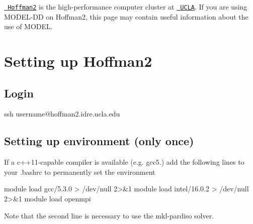 \href{https://idre.ucla.edu/hoffman2}{\texttt{ Hoffman2}} is the high-\/performance computer cluster at \href{http://www.ucla.edu}{\texttt{ U\+C\+LA}}. If you are using M\+O\+D\+E\+L-\/\+DD on Hoffman2, this page may contain useful information about the use of M\+O\+D\+EL.

\subparagraph*{}\hypertarget{hoffman2_hoffman2_setup}{}\section{Setting up Hoffman2}\label{hoffman2_hoffman2_setup}
\subparagraph*{}\hypertarget{hoffman2_hoffman2_login}{}\subsection{Login}\label{hoffman2_hoffman2_login}
\begin{DoxyVerb}ssh username@hoffman2.idre.ucla.edu
\end{DoxyVerb}


\subparagraph*{}\hypertarget{hoffman2_hoffman2_compiler}{}\subsection{Setting up environment (only once)}\label{hoffman2_hoffman2_compiler}
If a c++11-\/capable compiler is available (e.\+g. gcc5.) add the following lines to your .bashrc to permanently set the environment \begin{DoxyVerb}module load gcc/5.3.0 > /dev/null 2>&1 
module load intel/16.0.2 > /dev/null 2>&1
module load openmpi
\end{DoxyVerb}
 Note that the second line is necessary to use the mkl-\/pardiso solver.

